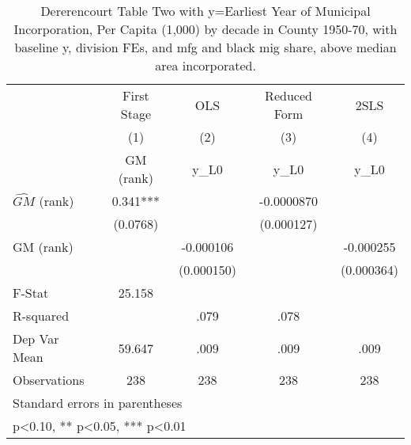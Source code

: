 \begin{table}[htbp]\centering
\def\sym#1{\ifmmode^{#1}\else\(^{#1}\)\fi}
\caption{Dererencourt Table Two with y=Earliest Year of Municipal Incorporation, Per Capita (1,000) by decade in County 1950-70, with baseline y, division FEs, and mfg and black mig share, above median area incorporated.}
\begin{tabular}{l*{4}{c}}
\toprule
                    & First Stage   &         OLS   &Reduced Form   &        2SLS   \\
                    &\multicolumn{1}{c}{(1)}&\multicolumn{1}{c}{(2)}&\multicolumn{1}{c}{(3)}&\multicolumn{1}{c}{(4)}\\
                    &\multicolumn{1}{c}{GM  (rank)}&\multicolumn{1}{c}{y\_L0}&\multicolumn{1}{c}{y\_L0}&\multicolumn{1}{c}{y\_L0}\\
\midrule
$\hat{GM}$ (rank)   &       0.341***&               &  -0.0000870   &               \\
                    &    (0.0768)   &               &  (0.000127)   &               \\
\addlinespace
GM  (rank)          &               &   -0.000106   &               &   -0.000255   \\
                    &               &  (0.000150)   &               &  (0.000364)   \\
\midrule
F-Stat              &      25.158   &               &               &               \\
R-squared           &               &        .079   &        .078   &               \\
Dep Var Mean        &      59.647   &        .009   &        .009   &        .009   \\
Observations        &         238   &         238   &         238   &         238   \\
\bottomrule
\multicolumn{5}{l}{\footnotesize Standard errors in parentheses}\\
\multicolumn{5}{l}{\footnotesize * p<0.10, ** p<0.05, *** p<0.01}\\
\end{tabular}
\end{table}

